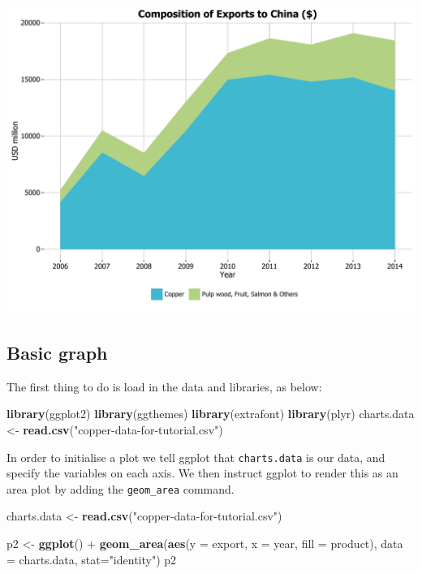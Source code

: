 \documentclass[]{article}
\newenvironment{Shaded}{\begin{snugshade}}{\end{snugshade}}
\newcommand{\KeywordTok}[1]{\textcolor[rgb]{0.13,0.29,0.53}{\textbf{{#1}}}}
\newcommand{\DataTypeTok}[1]{\textcolor[rgb]{0.13,0.29,0.53}{{#1}}}
\newcommand{\StringTok}[1]{\textcolor[rgb]{0.31,0.60,0.02}{{#1}}}
\newcommand{\NormalTok}[1]{{#1}}
\begin{document}
\begin{center}\includegraphics{0_all_posts_pdf/area_final-1} \end{center}

\subsection{Basic graph}\label{basic-graph-1}

The first thing to do is load in the data and libraries, as below:

\begin{Shaded}
\begin{Highlighting}[]
\KeywordTok{library}\NormalTok{(ggplot2)}
\KeywordTok{library}\NormalTok{(ggthemes)}
\KeywordTok{library}\NormalTok{(extrafont)}
\KeywordTok{library}\NormalTok{(plyr)}
\NormalTok{charts.data <-}\StringTok{ }\KeywordTok{read.csv}\NormalTok{(}\StringTok{"copper-data-for-tutorial.csv"}\NormalTok{)}
\end{Highlighting}
\end{Shaded}

In order to initialise a plot we tell ggplot that \texttt{charts.data}
is our data, and specify the variables on each axis. We then instruct
ggplot to render this as an area plot by adding the \texttt{geom\_area}
command.

\begin{Shaded}
\begin{Highlighting}[]
\NormalTok{charts.data <-}\StringTok{ }\KeywordTok{read.csv}\NormalTok{(}\StringTok{"copper-data-for-tutorial.csv"}\NormalTok{)}

\NormalTok{p2 <-}\StringTok{ }\KeywordTok{ggplot}\NormalTok{() +}\StringTok{ }\KeywordTok{geom_area}\NormalTok{(}\KeywordTok{aes}\NormalTok{(}\DataTypeTok{y =} \NormalTok{export, }\DataTypeTok{x =} \NormalTok{year, }\DataTypeTok{fill =} \NormalTok{product), }\DataTypeTok{data =} \NormalTok{charts.data, }
                           \DataTypeTok{stat=}\StringTok{"identity"}\NormalTok{)}
\NormalTok{p2}
\end{Highlighting}
\end{Shaded}
\end{document}
